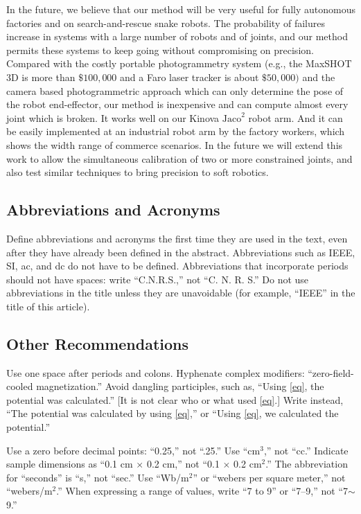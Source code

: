 \documentclass{ieeeaccess}
\begin{document}
In the future, we believe that our method will be very useful for fully autonomous factories and on search-and-rescue snake robots. The probability of failures increase in systems with a large number of robots and of joints, and our method permits these systems to keep going without compromising on precision. 
Compared with the costly portable photogrammetry system (e.g., the MaxSHOT 3D\cite{filion2018robot} is more than $\$100,000$ and a Faro laser tracker is about $\$50,000)$ and the camera based photogrammetric approach which can only determine the pose of the robot end-effector, our method is inexpensive and can compute almost every joint which is broken. It works well on our Kinova $\text{Jaco}^2$ robot arm. And it can be easily implemented at an industrial robot arm by the factory workers, which shows the width range of commerce scenarios.
In the future we will extend this work to allow the simultaneous calibration of two or more constrained joints, and also test similar techniques to bring precision to soft robotics.

\subsection{Abbreviations and Acronyms}
Define abbreviations and acronyms the first time they are used in the text, 
even after they have already been defined in the abstract. Abbreviations 
such as IEEE, SI, ac, and dc do not have to be defined. Abbreviations that 
incorporate periods should not have spaces: write ``C.N.R.S.,'' not ``C. N. 
R. S.'' Do not use abbreviations in the title unless they are unavoidable 
(for example, ``IEEE'' in the title of this article).

\subsection{Other Recommendations}
Use one space after periods and colons. Hyphenate complex modifiers: 
``zero-field-cooled magnetization.'' Avoid dangling participles, such as, 
``Using \eqref{eq}, the potential was calculated.'' [It is not clear who or what 
used \eqref{eq}.] Write instead, ``The potential was calculated by using \eqref{eq},'' or 
``Using \eqref{eq}, we calculated the potential.''

Use a zero before decimal points: ``0.25,'' not ``.25.'' Use 
``cm$^{3}$,'' not ``cc.'' Indicate sample dimensions as ``0.1 cm 
$\times $ 0.2 cm,'' not ``0.1 $\times $ 0.2 cm$^{2}$.'' The 
abbreviation for ``seconds'' is ``s,'' not ``sec.'' Use 
``Wb/m$^{2}$'' or ``webers per square meter,'' not 
``webers/m$^{2}$.'' When expressing a range of values, write ``7 to 
9'' or ``7--9,'' not ``7$\sim $9.''
\end{document}
